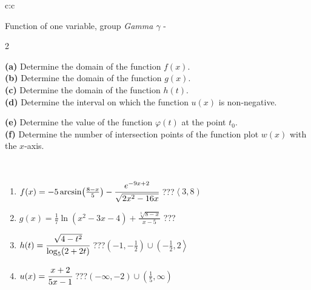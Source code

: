 \documentclass[10pt]{report}
\begin{document}
\begin{tabular}{c:c}
\begin{minipage}[c][104.5mm][t]{0.5\linewidth}
\begin{center}
\vspace{7mm}
{\huge Function of one variable, group \textit{Gamma $\gamma$} -}\\[5mm]
\begin{minipage}{0.95\linewidth}
\begin{center}
{\small \begin{multicols}{2} \raggedright
\textbf{(a)} Determine the domain of the function \(f(x)\). \\[1mm]
\textbf{(b)} Determine the domain of the function \(g(x)\). \\[1mm]
\textbf{(c)} Determine the domain of the function \(h(t)\). \\[1mm]
\textbf{(d)} Determine the interval on which the function \(u(x)\) is non-negative. \par \columnbreak
\textbf{(e)} Determine the value of the function \(\varphi(t)\) at the point \(t_0\). \\[1mm]
\textbf{(f)} Determine the number of intersection points of the function plot \(w(x)\) with the \(x\)-axis. \\[1mm]
\end{multicols}
}
\end{center}
\end{minipage}
\\[4mm]
\begin{minipage}{0.79\linewidth}
\begin{center}
\begin{varwidth}{\linewidth}
\begin{enumerate}
\small
\item $f(x) = -5\arcsin\!\left( \frac{8-x}{5} \right) - \cfrac{e^{-9x+2}}{\sqrt{2x^2-16x}}$\quad \dotfill\; ???\;\dotfill \quad $\left\langle3 , 8\right)$
\item $g(x) = \frac{1}{7} \ln{\!(x^2-3x-4)}+\frac{\sqrt[3]{8-x}}{x-5}$\quad \dotfill\; ???\;\dotfill {}
\item $h(t) = \cfrac{\sqrt{4-t^2}}{\log_5(2+2t)}$\quad \dotfill\; ???\;\dotfill \quad $\left(-1 , -\frac{1}{2}\right)\cup\left(-\frac{1}{2} , 2\right\rangle$
\item $u(x) = \cfrac{x+2}{5x-1}$\quad \dotfill\; ???\;\dotfill \quad $\left(-\infty , -2\right)\cup\left(\frac{1}{5} , \infty\right)$

\end{enumerate}
\end{varwidth}
\end{center}
\end{minipage}
\end{center}
\end{minipage}
\end{tabular}
\end{document}
